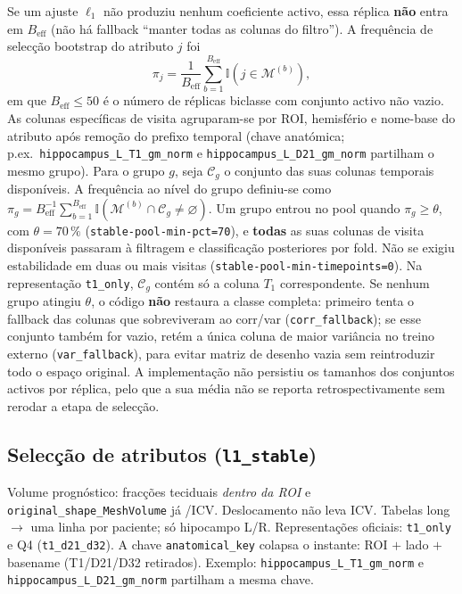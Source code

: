 \documentclass[review]{elsarticle}
\newcommand{\code}[1]{\texttt{#1}}
\begin{document}
Se um ajuste $\ell_1$ não produziu nenhum coeficiente activo, essa réplica \textbf{não} entra em $B_{\mathrm{eff}}$ (não há fallback ``manter todas as colunas do filtro'').
A frequência de selecção bootstrap do atributo $j$ foi
\begin{equation}
\pi_j = \frac{1}{B_{\mathrm{eff}}}\sum_{b=1}^{B_{\mathrm{eff}}} \mathbb{I}(j \in \mathcal{M}^{(b)}),
\label{eq:stability-freq}
\end{equation}
em que $B_{\mathrm{eff}}\leq 50$ é o número de réplicas biclasse com conjunto activo não vazio.
As colunas específicas de visita agruparam-se por ROI, hemisfério e nome-base do atributo após remoção do prefixo temporal (chave anatómica; p.ex.\ \code{hippocampus\_L\_T1\_gm\_norm} e \code{hippocampus\_L\_D21\_gm\_norm} partilham o mesmo grupo).
Para o grupo $g$, seja $\mathcal{C}_g$ o conjunto das suas colunas temporais disponíveis.
A frequência ao nível do grupo definiu-se como $\pi_g=B_{\mathrm{eff}}^{-1}\sum_{b=1}^{B_{\mathrm{eff}}}\mathbb{I}\!\left(\mathcal{M}^{(b)}\cap\mathcal{C}_g\neq\varnothing\right)$.
Um grupo entrou no pool quando $\pi_g\geq\theta$, com $\theta=70\,\%$ (\code{stable-pool-min-pct=70}), e \textbf{todas} as suas colunas de visita disponíveis passaram à filtragem e classificação posteriores por fold.
Não se exigiu estabilidade em duas ou mais visitas (\code{stable-pool-min-timepoints=0}).
Na representação \code{t1\_only}, $\mathcal{C}_g$ contém só a coluna $T_1$ correspondente.
Se nenhum grupo atingiu $\theta$, o código \textbf{não} restaura a classe completa: primeiro tenta o fallback das colunas que sobreviveram ao corr/var (\code{corr\_fallback}); se esse conjunto também for vazio, retém a única coluna de maior variância no treino externo (\code{var\_fallback}), para evitar matriz de desenho vazia sem reintroduzir todo o espaço original.
A implementação não persistiu os tamanhos dos conjuntos activos por réplica, pelo que a sua média não se reporta retrospectivamente sem rerodar a etapa de selecção.

\subsection{Selecção de atributos (\code{l1\_stable})}
\label{sec:feature-selection}

Volume prognóstico: fracções teciduais \emph{dentro da ROI} e \code{original\_shape\_MeshVolume} já /ICV.
Deslocamento não leva ICV.
Tabelas long $\to$ uma linha por paciente; só hipocampo L/R.
Representações oficiais: \code{t1\_only} e Q4 (\code{t1\_d21\_d32}).
A chave \code{anatomical\_key} colapsa o instante: ROI $+$ lado $+$ basename (T1/D21/D32 retirados). Exemplo: \code{hippocampus\_L\_T1\_gm\_norm} e \code{hippocampus\_L\_D21\_gm\_norm} partilham a mesma chave.
\end{document}
